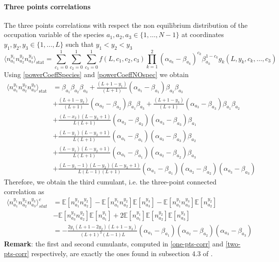 \documentclass[10pt]{article}
\numberwithin{equation}{section}
\numberwithin{equation}{subsection}
\begin{document}
\paragraph{Three points correlations}
The three points correlations with respect the non equilibrium distribution of the occupation variable of the species $a_{1},a_{2},a_{3}\in \{1,\ldots,N-1\}$ at coordinates $y_{1},y_{2},y_{3}\in \{1,\ldots,L\}$ such that $y_{1}<y_{2}<y_{3}$
\begin{equation}
    \langle n_{a_{1}}^{y_{1}}n_{a_{2}}^{y_{2}}n_{a_{3}}^{y_{3}}\rangle_{\text{stat}}=\sum_{c_{1}=0}^{1}\sum_{c_{2}=0}^{1}\sum_{c_{3}=0}^{1}f(L,c_{1},c_{2},c_{3})\prod_{k=1}^{2}(\alpha_{a_{k}}-\beta_{a_{k}})^{c_{k}}\beta_{a_{k}}^{1-c_{k}}g_{k}(L,y_{k},c_{k},\ldots,c_{3})
\end{equation}
Using \eqref{powerCoeffSpecies} and \eqref{powerCoeffNOspec} we obtain 
\begin{align}\label{three-pts-corr}
        \langle n_{a_{1}}^{y_{1}}n_{a_{2}}^{y_{2}}n_{a_{3}}^{y_{3}}\rangle_{\text{stat}}&=\beta_{a_{1}}\beta_{a_{2}}\beta_{a_{3}}+\frac{(L+1-y_{1})}{(L+1)}(\alpha_{a_{1}}-\beta_{a_{1}})\beta_{a_{2}}\beta_{a_{3}}
        \\&+\nonumber
        \frac{(L+1-y_{2})}{(L+1)}(\alpha_{a_{2}}-\beta_{a_{2}})\beta_{a_{1}}\beta_{a_{3}}+\frac{(L+1-y_{3})}{(L+1)}(\alpha_{a_{3}}-\beta_{a_{3}})\beta_{a_{1}}\beta_{a_{2}}
        \\&+\nonumber
        \frac{(L-x_{2})(L-y_{3}+1)}{L(L+1)}(\alpha_{a_{2}}-\beta_{a_{2}})(\alpha_{a_{3}}-\beta_{a_{3}})\beta_{a_{1}}
        \\&+\nonumber
        \frac{(L-y_{1})(L-y_{3}+1)}{L(L+1)}(\alpha_{a_{1}}-\beta_{a_{1}})(\alpha_{a_{3}}-\beta_{a_{3}})\beta_{a_{2}}
        \\&+\nonumber
        \frac{(L-y_{1})(L-y_{2}+1)}{L(L+1)}(\alpha_{a_{1}}-\beta_{a_{1}})(\alpha_{a_{2}}-\beta_{a_{2}})\beta_{a_{3}}
        \\&+\nonumber
        \frac{(L-y_{1}-1)(L-y_{2})(L-y_{3}+1)}{L(L-1)(L+1)}(\alpha_{a_{1}}-\beta_{a_{1}})(\alpha_{a_{2}}-\beta_{a_{2}})(\alpha_{a_{3}}-\beta_{a_{3}})
\end{align}
Therefore, we obtain the third cumulant, i.e. the three-point connected correlation as 
\begin{align}
	\langle n_{a_{1}}^{y_{1}}n_{a_{2}}^{y_{2}}n_{a_{3}}^{y_{3}}\rangle_{stat}^{c}&=\mathbb{E}\left[n_{a_{1}}^{y_{1}}n_{a_{2}}^{y_{2}}\right]-\mathbb{E}\left[n_{a_{1}}^{y_{1}}n_{a_{2}}^{y_{2}}\right]\mathbb{E}\left[n_{a_{3}}^{y_{3}}\right]-\mathbb{E}\left[n_{a_{1}}^{y_{1}}n_{a_{3}}^{y_{3}}\right]\mathbb{E}\left[n_{a_{2}}^{y_{2}}\right]\\&-\mathbb{E}\left[n_{a_{3}}^{y_{3}}n_{a_{2}}^{y_{2}}\right]\mathbb{E}\left[n_{a_{1}}^{y_{1}}\right]+2\mathbb{E}\left[n_{a_{1}}^{y_{1}}\right]\mathbb{E}\left[n_{a_{2}}^{y_{2}}\right]\mathbb{E}\left[n_{a_{3}}^{y_{3}}\right]
	\\&=
	-\frac{2y_{1}(L+1-2y_{2})(L+1-y_{3})}{(L+1)^{3}(L-1)L}(\alpha_{a_{1}}-\beta_{a_{1}})(\alpha_{a_{2}}-\beta_{a_{2}})(\alpha_{a_{3}}-\beta_{a_{3}})
\end{align}
\textbf{Remark}: the first and second cumulants, computed in \eqref{one-pts-corr} and \eqref{two-pts-corr} respectively, are exactly the ones found in subsection 4.3 of \cite{vanicat2017exact}. 
\end{document}
